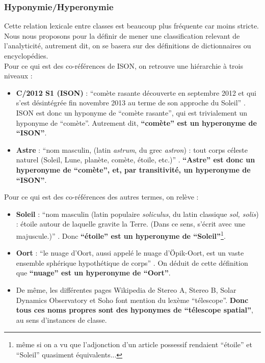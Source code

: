 \documentclass[a4paper,10pt]{article}
\begin{document}
		\subsubsection{Hyponymie/Hyperonymie}
			Cette relation lexicale entre classes est beaucoup plus fréquente car moins stricte. Nous nous proposons pour la définir de mener une classification relevant de l'analyticité, autrement dit, on se basera sur des définitions de dictionnaires ou encyclopédies.\\
			Pour ce qui est des co-références de ISON, on retrouve une hiérarchie à trois niveaux :
			\begin{itemize}
				\item \textbf{C/2012 S1 (ISON)} : ``comète rasante découverte en septembre 2012 et qui s'est désintégrée fin novembre 2013 au terme de son approche du Soleil'' \cite{ISON}. ISON est donc un hyponyme de ``comète rasante'', qui est trivialement un hyponyme de ``comète''. Autrement dit, \textbf{``comète'' est un hyperonyme de ``ISON''}.
				\item \textbf{Astre} : ``nom masculin, (latin \textit{astrum}, du grec \textit{astron}) : tout corps céleste naturel (Soleil, Lune, planète, comète, étoile, etc.)'' \cite{astre}. \textbf{``Astre'' est donc un hyperonyme de ``comète'', et, par transitivité, un hyperonyme de ``ISON''}.
			\end{itemize}
			Pour ce qui est des co-références des autres termes, on relève :
			\begin{itemize}
				\item \textbf{Soleil} : ``nom masculin
				(latin populaire \textit{soliculus}, du latin classique \textit{sol, solis}) : étoile autour de laquelle gravite la Terre. (Dans ce sens, s'écrit avec une majuscule.)'' \cite{soleil}. Donc \textbf{``étoile'' est un hyperonyme de ``Soleil''}\footnote{même si on a vu que l'adjonction d'un article possessif rendaient ``étoile'' et ``Soleil'' quasiment équivalents...}.
				\item \textbf{Oort} : ``le nuage d'Oort, aussi appelé le nuage d'Öpik-Oort, est un vaste ensemble sphérique hypothétique de corps'' \cite{oort}. On déduit de cette définition que \textbf{``nuage'' est un hyperonyme de ``Oort''}.
				\item De même, les différentes pages Wikipedia de Stereo A, Stereo B, Solar Dynamics Observatory et Soho font mention du lexème ``télescope''. \textbf{Donc tous ces noms propres sont des hyponymes de ``télescope spatial''}, au sens d'instances de classe.
			\end{itemize}
\end{document}
